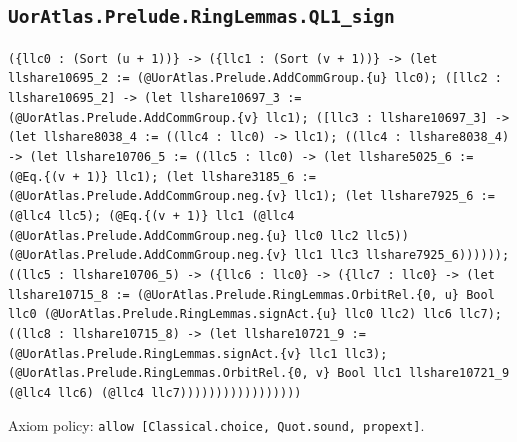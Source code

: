 \documentclass[11pt]{article}
\begin{document}
\subsection*{\texttt{UorAtlas.Prelude.RingLemmas.QL1\_sign}}
\noindent\texttt{(\{llc0 : (Sort (u + 1))\} -> (\{llc1 : (Sort (v + 1))\} -> (let llshare10695\_2 := (@UorAtlas.Prelude.AddCommGroup.\{u\} llc0); ([llc2 : llshare10695\_2] -> (let llshare10697\_3 := (@UorAtlas.Prelude.AddCommGroup.\{v\} llc1); ([llc3 : llshare10697\_3] -> (let llshare8038\_4 := ((llc4 : llc0) -> llc1); ((llc4 : llshare8038\_4) -> (let llshare10706\_5 := ((llc5 : llc0) -> (let llshare5025\_6 := (@Eq.\{(v + 1)\} llc1); (let llshare3185\_6 := (@UorAtlas.Prelude.AddCommGroup.neg.\{v\} llc1); (let llshare7925\_6 := (@llc4 llc5); (@Eq.\{(v + 1)\} llc1 (@llc4 (@UorAtlas.Prelude.AddCommGroup.neg.\{u\} llc0 llc2 llc5)) (@UorAtlas.Prelude.AddCommGroup.neg.\{v\} llc1 llc3 llshare7925\_6)))))); ((llc5 : llshare10706\_5) -> (\{llc6 : llc0\} -> (\{llc7 : llc0\} -> (let llshare10715\_8 := (@UorAtlas.Prelude.RingLemmas.OrbitRel.\{0, u\} Bool llc0 (@UorAtlas.Prelude.RingLemmas.signAct.\{u\} llc0 llc2) llc6 llc7); ((llc8 : llshare10715\_8) -> (let llshare10721\_9 := (@UorAtlas.Prelude.RingLemmas.signAct.\{v\} llc1 llc3); (@UorAtlas.Prelude.RingLemmas.OrbitRel.\{0, v\} Bool llc1 llshare10721\_9 (@llc4 llc6) (@llc4 llc7)))))))))))))))))}\par
\noindent Axiom policy: \texttt{allow [Classical.choice, Quot.sound, propext]}.\par
\end{document}
